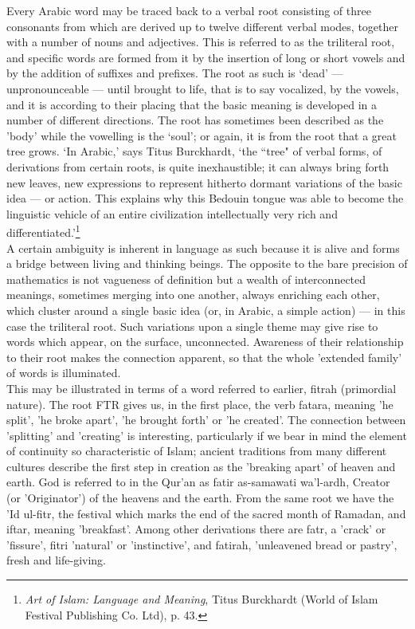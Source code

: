 \documentclass[10pt, twoside]{book}
\begin{document}
Every Arabic word may be traced back to a verbal root consisting of three consonants from which are 
derived up to twelve different verbal modes, together with a number of nouns and adjectives. This is 
referred to as the triliteral root, and specific words are formed from it by the insertion of long or 
short vowels and by the addition of suffixes and prefixes. The root as such is `dead' --- 
unpronounceable --- until brought to life, that is to say vocalized, by the vowels, and it is according 
to their placing that the basic meaning is developed in a number of different directions. The root 
has sometimes been described as the 'body' while the vowelling is the `soul'; or again, it is from 
the root that a great tree grows. `In Arabic,' says Titus Burckhardt, `the ``tree" of verbal forms, of 
derivations from certain roots, is quite inexhaustible; it can always bring forth new leaves, new 
expressions to represent hitherto dormant variations of the basic idea --- or action. This explains why 
this Bedouin tongue was able to become the linguistic vehicle of an entire civilization 
intellectually very rich and differentiated.'\footnote{\emph{Art of Islam: Language and Meaning}, Titus Burckhardt (World of Islam Festival Publishing Co. Ltd), p. 43.}\\

A certain ambiguity is inherent in language as such because it is alive and forms a bridge between 
living and thinking beings. The opposite to the bare precision of mathematics is not vagueness of 
definition but a wealth of interconnected meanings, sometimes merging into one another, always 
enriching each other, which cluster around a single basic idea (or, in Arabic, a simple action) --- in 
this case the triliteral root. Such variations upon a single theme may give rise to words which 
appear, on the surface, unconnected. Awareness of their relationship to their root makes the 
connection apparent, so that the whole 'extended family' of words is illuminated. \\

This may be illustrated in terms of a word referred to earlier, fitrah (primordial nature). The root 
FTR gives us, in the first place, the verb fatara, meaning 'he split', 'he broke apart', 'he brought 
forth' or 'he created'. The connection between 'splitting' and 'creating' is interesting, 
particularly if we bear in mind the element of continuity so characteristic of Islam; ancient 
traditions from many different cultures describe the first step in creation as the 'breaking apart' 
of heaven and earth. God is referred to in the Qur'an as fatir as\hyp{}samawati wa'l\hyp{}ardh, Creator (or 
'Originator') of the heavens and the earth. From the same root we have the 'Id ul\hyp{}fitr, the festival 
which marks the end of the sacred month of Ramadan, and iftar, meaning 'breakfast'. Among other 
derivations there are fatr, a 'crack' or 'fissure', fitri 'natural' or 'instinctive', and fatirah, 
'unleavened bread or pastry', fresh and life\hyp{}giving. \\
\end{document}

